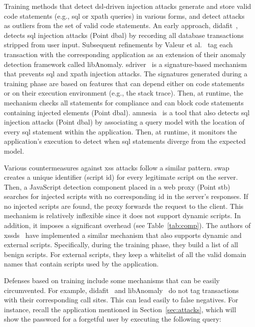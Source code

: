 \documentclass[10pt,journal,compsoc]{IEEEtran}
\begin{document}
Training methods that detect {\sc dsl}-driven injection attacks
generate and store valid code statements (e.g., {\sc sql} or {\sc
  xp}ath queries) in various forms, and detect attacks as outliers
from the set of valid code statements. An early approach,
{\sc didafit}~\cite{LLW02}, detects {\sc sql} injection attacks (Point
{\sc dbal}) by recording all database transactions
stripped from user input. Subsequent
refinements by Valeur et al.~\cite{VMV05} tag each transaction with
the corresponding application as an extension of their anomaly
detection framework called libAnomaly.
{\sc sd}river~\cite{MS09,MKLS11} is a signature-based mechanism
that prevents {\sc sql} and {\sc xp}ath injection attacks. The
signatures generated during a training phase are based on features
that can depend either on code statements or on their execution
environment (e.g., the stack trace). Then, at runtime, the mechanism
checks all statements for compliance and can block code statements
containing injected elements (Point {\sc dbal}).
{\sc amnesia}~\cite{HO05,HO06,HO05b} is a tool that also detects
{\sc sql} injection attacks (Point {\sc dbal}) by associating a query model
with the location of every {\sc sql} statement within the application.
Then, at runtime, it monitors the application's execution to detect
when {\sc sql} statements diverge from the expected model.

Various countermeasures against {\sc xss} attacks follow a similar
pattern. {\sc swap}~\cite{WPLKK09} creates a unique identifier
(script {\sc id}) for every legitimate script on the server.
Then, a JavaScript detection component placed in a web proxy (Point
{\sc s}t{\sc b}) searches for injected scripts with no corresponding {\sc id}
in the server's responses. If no injected scripts are found, the proxy
forwards the request to the client. This mechanism is relatively
inflexible since it does not support dynamic scripts. In addition, it
imposes a significant overhead (see Table~\ref{tab:comp}). The authors
of {\sc xssds}~\cite{JEP08} have implemented a similar mechanism
that also supports dynamic and external scripts. Specifically, during the
training phase, they build a list of all benign scripts. For
external scripts, they keep a whitelist of all the valid domain names
that contain scripts used by the application.

Defenses based on training include some mechanisms that can be easily
circumvented. For example, {\sc didafit}~\cite{LLW02}
and libAnomaly~\cite{VMV05} do not tag transactions with their
corresponding call sites. This can lead
easily to false negatives. For instance, recall the application
mentioned in Section~\ref{sec:attacks}, which will show the password
for a forgetful user by executing the following query:
\end{document}
